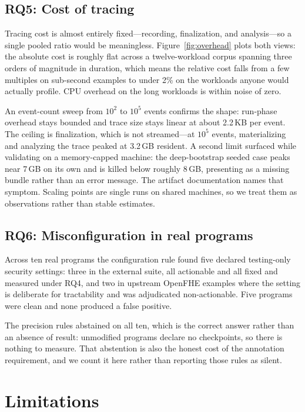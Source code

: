 \documentclass[sigconf,nonacm]{acmart}
\begin{document}
\subsection{RQ5: Cost of tracing}
\label{sec:rq5}

Tracing cost is almost entirely fixed---recording, finalization, and
analysis---so a single pooled ratio would be meaningless. Figure~\ref{fig:overhead}
plots both views: the absolute cost is roughly flat across a twelve-workload
corpus spanning three orders of magnitude in duration, which means the
relative cost falls from a few multiples on sub-second examples to under 2\%
on the workloads anyone would actually profile. CPU overhead on the long
workloads is within noise of zero.

An event-count sweep from $10^2$ to $10^5$ events confirms the shape:
run-phase overhead stays bounded and trace size stays linear at about
2.2\,KB per event. The ceiling is finalization, which is not streamed---at
$10^5$ events, materializing and analyzing the trace peaked at 3.2\,GB
resident. A second limit surfaced while validating on a memory-capped
machine: the deep-bootstrap seeded case peaks near 7\,GB on its own and is
killed below roughly 8\,GB, presenting as a missing bundle rather than an
error message. The artifact documentation names that symptom. Scaling points
are single runs on shared machines, so we treat them as observations rather
than stable estimates.

\subsection{RQ6: Misconfiguration in real programs}
\label{sec:rq6}

Across ten real programs the configuration rule found five declared
testing-only security settings: three in the external suite, all actionable
and all fixed and measured under RQ4, and two in upstream OpenFHE examples
where the setting is deliberate for tractability and was adjudicated
non-actionable. Five programs were clean and none produced a false positive.

The precision rules abstained on all ten, which is the correct answer rather
than an absence of result: unmodified programs declare no checkpoints, so
there is nothing to measure. That abstention is also the honest cost of the
annotation requirement, and we count it here rather than reporting those
rules as silent.

\section{Limitations}
\label{sec:limits}
\end{document}
